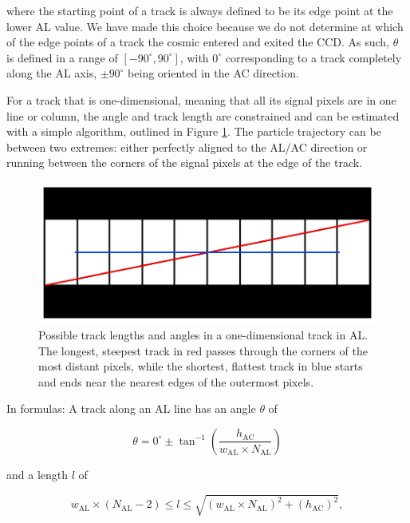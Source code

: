 \documentclass[a4paper, 11pt]{article}
\begin{document}
where the starting point of a track is always defined to be its edge point at the lower AL value. We have made this choice because we do not determine at which of the edge points of a track the cosmic entered and exited the CCD. As such, $\theta$ is defined in a range of $\left[ -90^{\circ}, 90^{\circ} \right]$, with $0^{\circ}$ corresponding to a track completely along the AL axis, $\pm 90 ^{\circ}$ being oriented in the AC direction.

For a track that is one-dimensional, meaning that all its signal pixels are in one line or column, the angle and track length are constrained and can be estimated with a simple algorithm, outlined in Figure \ref{fig:1D_angle}. The particle trajectory can be between two extremes: either perfectly aligned to the AL/AC direction or running between the corners of the signal pixels at the edge of the track.

\begin{figure}
  \centering
  \includegraphics{images/postprocessing/1D_angle}
  \caption{Possible track lengths and angles in a one-dimensional track in AL. The longest, steepest track in red passes through the corners of the most distant pixels, while the shortest, flattest track in blue starts and ends near the nearest edges of the outermost pixels.}
  \label{fig:1D_angle}
\end{figure}

In formulas: A track along an AL line has an angle $\theta$ of

\begin{equation}
  \theta = 0^{\circ} \pm \tan^{-1} \left( \frac{{h_\mathrm{AC}}}{w_\mathrm{AL} \times N_\mathrm{AL}} \right)
  \label{eq:1Dtrackang}
\end{equation}

and a length $l$ of

\begin{equation}
  w_\mathrm{AL} \times \left(N_\mathrm{AL}-2\right) \leq l \leq \sqrt{\left( w_\mathrm{AL} \times N_\mathrm{AL} \right)^{2} + \left( h_\mathrm{AC}\right)^{2}},
  \label{eq:1Dtracklen}
\end{equation}
\end{document}
